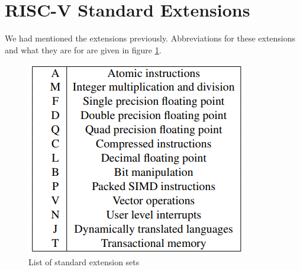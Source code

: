 \section{RISC-V Standard Extensions}
We had mentioned the extensions previously. Abbreviations for these extensions and what they are for are given in figure \ref{fig:list_of_standard_extension_sets}.
\begin{figure}[h!]
    \centering
    \includegraphics{riscv/list_of_standard_extension_sets.png}
    \caption{List of standard extension sets \cite{erfan}}
    \label{fig:list_of_standard_extension_sets}
\end{figure}

